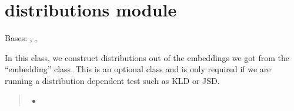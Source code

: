 \documentclass[letterpaper,10pt,english]{sphinxmanual}
\begin{document}
\sphinxstepscope


\section{distributions module}
\label{\detokenize{fldModules/distributions:module-distributions}}\label{\detokenize{fldModules/distributions:distributions-module}}\label{\detokenize{fldModules/distributions::doc}}

\begin{fulllineitems}
\label{\detokenize{fldModules/distributions:distributions.distributions}}
\pysigstartsignatures
{}
\pysigstopsignatures
\sphinxAtStartPar
Bases: {\hyperref[\detokenize{fldModules/embedding:embedding.embedding}]{}}, {\hyperref[\detokenize{baseModules/sampling:sampling.samplingData}]{}}, {\hyperref[\detokenize{baseModules/base:base.detectorParent}]{}}

\begin{fulllineitems}
\label{\detokenize{fldModules/distributions:distributions.distributions.__init__}}
\pysigstartsignatures
{}
\pysigstopsignatures
\sphinxAtStartPar
In this class, we construct distributions out of the embeddings we got from the “embedding” class.
This is an optional class and is only required if we are running a distribution dependent test such
as KLD or JSD.
\begin{quote}\begin{description}
\sphinxAtStartPar
\begin{itemize}
\item {} 
\sphinxAtStartPar
{}


\end{itemize}
\end{description}
\end{quote}
\end{fulllineitems}
\end{fulllineitems}
\end{document}

